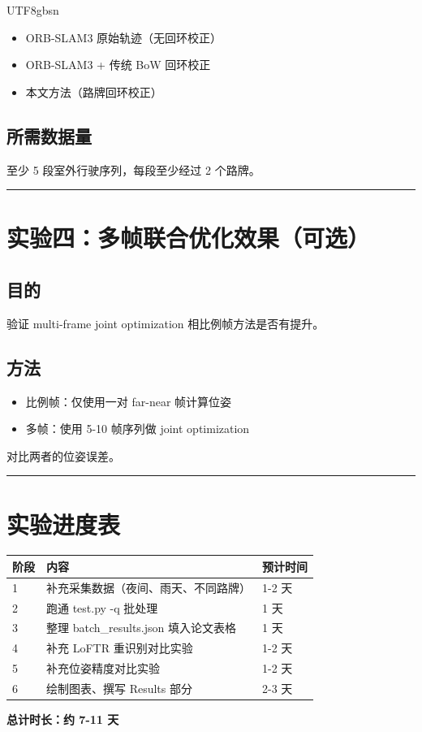 \documentclass{article}
\begin{document}
\begin{CJK}{UTF8}{gbsn}
\begin{itemize}
    \item ORB-SLAM3 原始轨迹（无回环校正）
    \item ORB-SLAM3 + 传统 BoW 回环校正
    \item 本文方法（路牌回环校正）
\end{itemize}

\subsection{所需数据量}
至少 5 段室外行驶序列，每段至少经过 2 个路牌。

\vspace{0.5cm}
\hrule

\section{实验四：多帧联合优化效果（可选）}

\subsection{目的}
验证 multi-frame joint optimization 相比例帧方法是否有提升。

\subsection{方法}

\begin{itemize}
    \item 比例帧：仅使用一对 far-near 帧计算位姿
    \item 多帧：使用 5-10 帧序列做 joint optimization
\end{itemize}

对比两者的位姿误差。

\vspace{0.5cm}
\hrule

\section{实验进度表}

\begin{tabular}{lll}
\toprule
阶段 & 内容 & 预计时间 \\
\midrule
1 & 补充采集数据（夜间、雨天、不同路牌） & 1-2 天 \\
2 & 跑通 test.py -q 批处理 & 1 天 \\
3 & 整理 batch\_results.json 填入论文表格 & 1 天 \\
4 & 补充 LoFTR 重识别对比实验 & 1-2 天 \\
5 & 补充位姿精度对比实验 & 1-2 天 \\
6 & 绘制图表、撰写 Results 部分 & 2-3 天 \\
\bottomrule
\end{tabular}

\vspace{1cm}
\noindent\textbf{总计时长：约 7-11 天}

\end{CJK}
\end{document}
